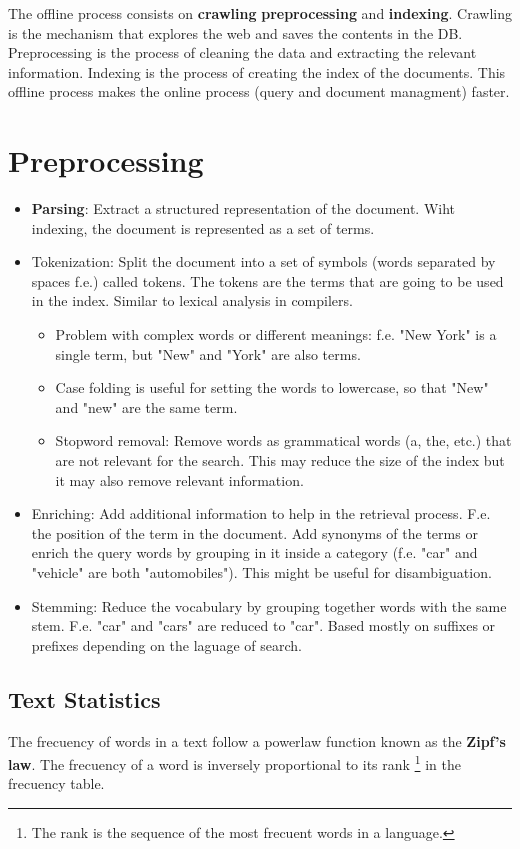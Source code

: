 \documentclass{article}
\begin{document}
The offline process consists on \textbf{crawling} \textbf{preprocessing} and \textbf{indexing}. Crawling is the mechanism that explores the web and saves the contents in the DB. Preprocessing is the process of cleaning the data and extracting the relevant information. Indexing is the process of creating the index of the documents. This offline process makes the online process (query and document managment) faster.

\section{Preprocessing}
\begin{itemize}
    \item \textbf{Parsing}: Extract a structured representation of the document. Wiht indexing, the document is represented as a set of terms.
    \item Tokenization: Split the document into a set of symbols (words separated by spaces f.e.) called tokens. The tokens are the terms that are going to be used in the index.  Similar to lexical analysis in compilers.
    \begin{itemize}
        \item Problem with complex words or different meanings: f.e. "New York" is a single term, but "New" and "York" are also terms.
        \item Case folding is useful for setting the words to lowercase, so that "New" and "new" are the same term.
        \item Stopword removal: Remove words as grammatical words (a, the, etc.) that are not relevant for the search. This may reduce the size of the index but it may also remove relevant information.
    \end{itemize}
    \item Enriching: Add additional information to help in the retrieval process. F.e. the position of the term in the document. Add synonyms of the terms or enrich the query words by grouping in it inside a category (f.e. "car" and "vehicle" are both "automobiles"). This might be useful for disambiguation.
    \item Stemming: Reduce the vocabulary by grouping together words with the same stem. F.e. "car" and "cars" are reduced to "car". Based mostly on suffixes or prefixes depending on the laguage of search.
\end{itemize}
    
\subsection{Text Statistics}
The frecuency of words in a text follow a powerlaw function known as the \textbf{Zipf's law}. The frecuency of a word is inversely proportional to its rank \footnote{The rank is the sequence of the most frecuent words in a language.} in the frecuency table.
\end{document}
